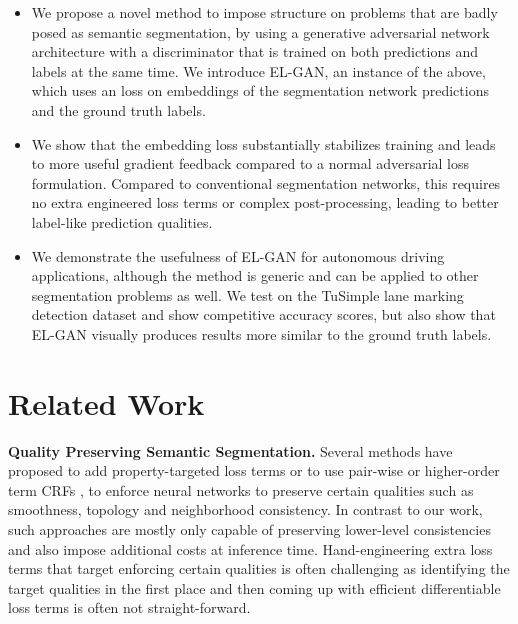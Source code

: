 \documentclass{article} \usepackage{nips13submit_e,times}
\newcommand{\elgan}{\mbox{EL-GAN}}
\begin{document}
\begin{itemize}

  \item
  We propose a novel method to impose structure on problems that are badly posed as semantic segmentation, by using a generative adversarial network architecture with a discriminator that is trained on both predictions and labels at the same time.
  We introduce \elgan{}, an instance of the above, which uses an  loss on embeddings of the segmentation network predictions and the ground truth labels.

  \item
  We show that the embedding loss substantially stabilizes training and leads to more useful gradient feedback compared to a normal adversarial loss formulation.
  Compared to conventional segmentation networks, this requires no extra engineered loss terms or complex post-processing, leading to better label-like prediction qualities.


  \item
  We demonstrate the usefulness of \elgan{} for autonomous driving applications, although the method is generic and can be applied to other segmentation problems as well.
  We test on the TuSimple lane marking detection dataset and show competitive accuracy scores, but also show that \elgan{} visually produces results more similar to the ground truth labels.


\end{itemize}



\section{Related Work}



\textbf{Quality Preserving Semantic Segmentation.}
Several methods have proposed to add property-targeted loss terms \cite{bentaieb2016topology,oktay2017anatomically} or to use pair-wise or higher-order term CRFs \cite{krahenbuhl2011efficient,zheng2015conditional,schwing2015fully}, to enforce neural networks to preserve certain qualities such as smoothness, topology and neighborhood consistency. 
In contrast to our work, such approaches are mostly only capable of preserving lower-level consistencies and also impose additional costs at inference time.
Hand-engineering extra loss terms that target enforcing certain qualities is often challenging as identifying the target qualities in the first place and then coming up with efficient differentiable loss terms is often not straight-forward.
\end{document}
